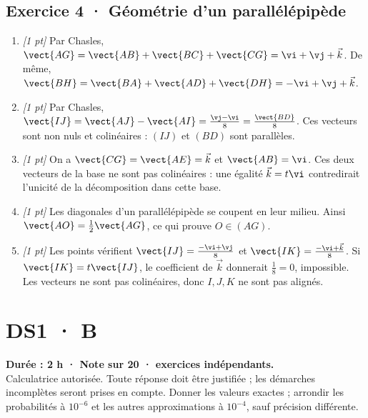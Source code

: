 \subsection*{Exercice 4 · Géométrie d'un parallélépipède}\begin{enumerate}

\item \textit{[1 pt]} Par Chasles, $\vect{AG}=\vect{AB}+\vect{BC}+\vect{CG}=\vi +\vj +\vec k$. De même, $\vect{BH}=\vect{BA}+\vect{AD}+\vect{DH}=-\vi +\vj +\vec k$.

\item \textit{[1 pt]} Par Chasles, $\vect{IJ}=\vect{AJ}-\vect{AI}=\frac{\vj -\vi }{8}=\frac{\vect{BD}}{8}$. Ces vecteurs sont non nuls et colinéaires : $(IJ)$ et $(BD)$ sont parallèles.

\item \textit{[1 pt]} On a $\vect{CG}=\vect{AE}=\vec k$ et $\vect{AB}=\vi $. Ces deux vecteurs de la base ne sont pas colinéaires : une égalité $\vec k=t\vi $ contredirait l'unicité de la décomposition dans cette base.

\item \textit{[1 pt]} Les diagonales d'un parallélépipède se coupent en leur milieu. Ainsi $\vect{AO}=\frac12\vect{AG}$, ce qui prouve $O\in(AG)$.

\item \textit{[1 pt]} Les points vérifient $\vect{IJ}=\frac{-\vi +\vj }{8}$ et $\vect{IK}=\frac{-\vi +\vec k}{8}$. Si $\vect{IK}=t\vect{IJ}$, le coefficient de $\vec k$ donnerait $\frac{1}{8}=0$, impossible. Les vecteurs ne sont pas colinéaires, donc $I,J,K$ ne sont pas alignés.

\end{enumerate}

\fi

\fi

\ifmxteacher

\mxnewpage{}\label{sujet:1-4}

\section*{DS1 · B}


\textbf{Durée : 2 h · Note sur 20 ·  exercices indépendants.}\\Calculatrice autorisée. Toute réponse doit être justifiée ; les démarches incomplètes seront prises en compte. Donner les valeurs exactes ; arrondir les probabilités à $10^{-6}$ et les autres approximations à $10^{-4}$, sauf précision différente.

